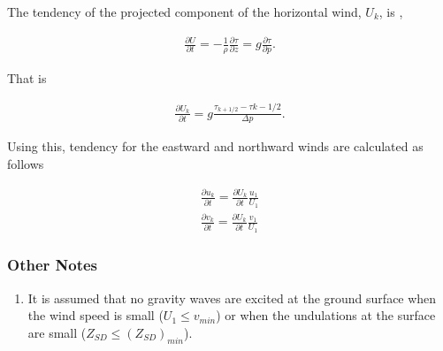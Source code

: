 The tendency of the projected component of the horizontal wind,
\(U_{k}\), is ,

\begin{eqnarray}
  \frac{\partial U}{\partial t}
        = - \frac{1}{\rho} \frac{\partial \tau}{\partial z}
        = g  \frac{\partial \tau}{\partial p}.
\end{eqnarray}

That is

\begin{eqnarray}
  \frac{\partial U_{k}}{\partial t}
        =  g  \frac{\tau_{k+1/2} - \tau{k-1/2}}{\Delta p}.
\end{eqnarray}

Using this, tendency for the eastward and northward winds are calculated
as follows

\begin{eqnarray}
  \frac{\partial u_{k}}{\partial t}  =
           \frac{\partial U_{k}}{\partial t} \frac{u_{1}}{U_{1}} \\
  \frac{\partial v_{k}}{\partial t}  =
           \frac{\partial U_{k}}{\partial t} \frac{v_{1}}{U_{1}}
\end{eqnarray}

\hypertarget{other-notes}{%
\subsubsection{Other Notes}\label{other-notes}}

\begin{enumerate}
\def\labelenumi{\arabic{enumi}.}
\tightlist
\item
  It is assumed that no gravity waves are excited at the ground surface
  when the wind speed is small (\(U_{1} \le v_{min}\)) or when the
  undulations at the surface are small (\(Z_{SD} \le (Z_{SD})_{min}\)).
\end{enumerate}
